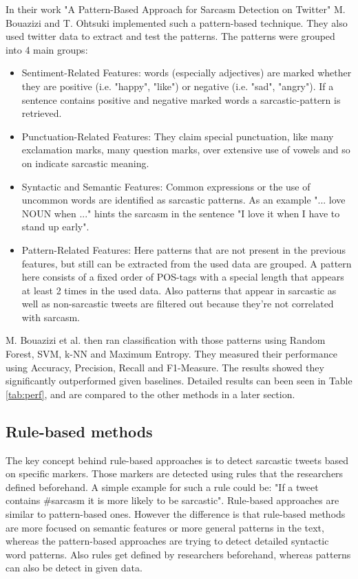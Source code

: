 \documentclass[sigconf,  review=false, nonacm=true]{acmart}
\begin{document}
In their work "A Pattern-Based Approach for Sarcasm Detection on Twitter" \cite{pattern} M. Bouazizi and T. Ohtsuki implemented such a pattern-based technique. They also used twitter data to extract and test the patterns. The patterns were grouped into 4 main groups:
\begin{itemize}
 \item Sentiment-Related Features: words (especially adjectives) are marked whether they are positive (i.e. "happy", "like") or negative (i.e. "sad", "angry"). If a sentence contains positive and negative marked words a sarcastic-pattern is retrieved.
 \item Punctuation-Related Features: They claim special punctuation, like many exclamation marks, many question marks, over extensive use of vowels and so on indicate sarcastic meaning.
 \item Syntactic and Semantic Features: Common expressions or the use of uncommon words are identified as sarcastic patterns. As an example "... love NOUN when ..." hints the sarcasm in the sentence "I love it when I have to stand up early".
 \item Pattern-Related Features: Here patterns that are not present in the previous features, but still can be extracted from the used data are grouped. A pattern here consists of a fixed order of POS-tags with a special length that appears at least 2 times in the used data. Also patterns that appear in sarcastic as well as non-sarcastic tweets are filtered out because they're not correlated with sarcasm.
\end{itemize}

M. Bouazizi et al. then ran classification with those patterns using Random Forest, SVM, k-NN and Maximum Entropy. They measured their performance using Accuracy, Precision, Recall and F1-Measure. The results showed they significantly outperformed given baselines. Detailed results can been seen in Table \ref{tab:perf}, and are compared to the other methods in a later section.


\subsection{Rule-based methods}

The key concept behind rule-based approaches is to detect sarcastic tweets based on specific markers. Those markers are detected using rules that the researchers defined beforehand. A simple example for such a rule could be: "If a tweet contains \#sarcasm it is more likely to be sarcastic". Rule-based approaches are similar to pattern-based ones. However the difference is that rule-based methods are more focused on semantic features or more general patterns in the text, whereas the pattern-based approaches are trying to detect detailed syntactic word patterns. Also rules get defined by researchers beforehand, whereas patterns can also be detect in given data.
\end{document}
